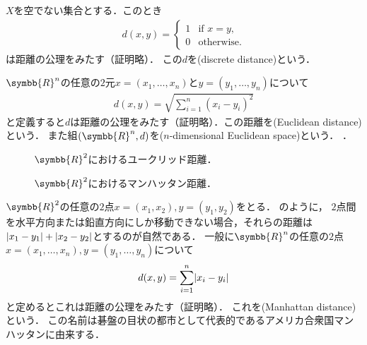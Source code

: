 \documentclass{ltjsbook}
\begin{document}
\begin{example}
\(X\)を空でない集合とする．このとき
\begin{align*}
    d(x, y) =  \begin{cases} 1 & \text{if \(x = y\),} \\ 0 & \text{otherwise.} \end{cases}
\end{align*}
は距離の公理をみたす（証明略）．
この\(d\)を(discrete distance)という．
\end{example}

\begin{example} \(\symbb{R}^n\)の任意の\(2\)元\(x = (x_1, \ldots, x_n)\)と\(y = (y_1, \ldots, y_n)\)について
\begin{align*}
    d(x, y) = \sqrt{\sum_{i = 1}^n (x_i - y_i)^2}
\end{align*}
と定義すると\(d\)は距離の公理をみたす（証明略）．この距離を(Euclidean distance)という．
また組\(\tuple{\symbb{R}^n, d}\)を(\(n\)-dimensional Euclidean space)という．
．
\end{example}

\begin{figure}
\begin{minipage}{0.5\textwidth}
    \centering
    
    \caption{\(\symbb{R}^2\)におけるユークリッド距離．}
\end{minipage}
\begin{minipage}{0.5\textwidth}
    \centering
    
    \caption{\(\symbb{R}^2\)におけるマンハッタン距離．}
\end{minipage}
\end{figure}

\begin{example}
\(\symbb{R}^2\)の任意の\(2\)点\(x = (x_1, x_2), y = (y_1, y_2)\)をとる．
のように，
\(2\)点間を水平方向または鉛直方向にしか移動できない場合，それらの距離は\(\lvert x_1 - y_1 \rvert + \lvert x_2 - y_2 \rvert\)とするのが自然である．
一般に\(\symbb{R}^n\)の任意の\(2\)点\(x = (x_1, \ldots, x_n), y = (y_1, \ldots, y_n)\)について
\begin{align*}
    d(x, y) = \sum_{i = 1}^n \lvert x_i - y_i \rvert
\end{align*}
と定めるとこれは距離の公理をみたす（証明略）．
これを(Manhattan distance)という．
この名前は碁盤の目状の都市として代表的であるアメリカ合衆国マンハッタンに由来する．
\end{example}
\end{document}

